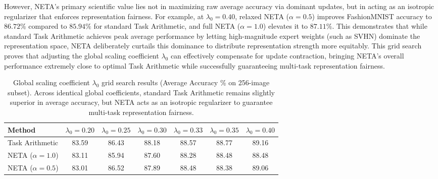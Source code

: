 However, NETA's primary scientific value lies not in maximizing raw average accuracy via dominant updates, but in acting as an isotropic regularizer that enforces representation fairness. For example, at $\lambda_0 = 0.40$, relaxed NETA ($\alpha = 0.5$) improves FashionMNIST accuracy to $86.72\%$ compared to $85.94\%$ for standard Task Arithmetic, and full NETA ($\alpha = 1.0$) elevates it to $87.11\%$. This demonstrates that while standard Task Arithmetic achieves peak average performance by letting high-magnitude expert weights (such as SVHN) dominate the representation space, NETA deliberately curtails this dominance to distribute representation strength more equitably. This grid search proves that adjusting the global scaling coefficient $\lambda_0$ can effectively compensate for update contraction, bringing NETA's overall performance extremely close to optimal Task Arithmetic while successfully guaranteeing multi-task representation fairness.

\begin{table}[ht]
\caption{Global scaling coefficient $\lambda_0$ grid search results (Average Accuracy \% on 256-image subset). Across identical global coefficients, standard Task Arithmetic remains slightly superior in average accuracy, but NETA acts as an isotropic regularizer to guarantee multi-task representation fairness.}
\label{tab:lambda_grid}
\vskip 0.15in
\begin{center}
\begin{small}
\begin{sc}
\begin{tabular}{lcccccc}
\toprule
Method & $\lambda_0 = 0.20$ & $\lambda_0 = 0.25$ & $\lambda_0 = 0.30$ & $\lambda_0 = 0.33$ & $\lambda_0 = 0.35$ & $\lambda_0 = 0.40$ \\
\midrule
Task Arithmetic & 83.59 & 86.43 & 88.18 & 88.57 & 88.77 & 89.16 \\
NETA ($\alpha = 1.0$) & 83.11 & 85.94 & 87.60 & 88.28 & 88.48 & 88.48 \\
NETA ($\alpha = 0.5$) & 83.01 & 86.52 & 87.89 & 88.48 & 88.38 & 89.06 \\
\bottomrule
\end{tabular}
\end{sc}
\end{small}
\end{center}
\vskip -0.1in
\end{table}

